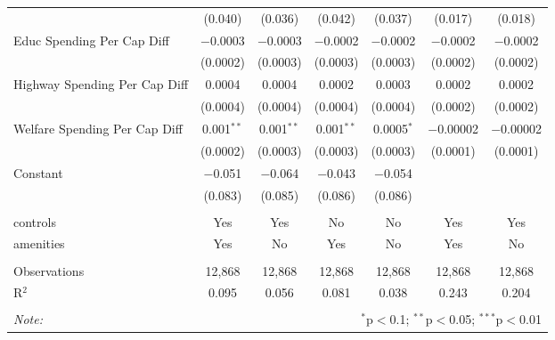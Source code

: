 \begin{table}[!htbp]
\begin{tabular}{@{\extracolsep{5pt}}lcccccc}
  & (0.040) & (0.036) & (0.042) & (0.037) & (0.017) & (0.018) \\ 
  Educ Spending Per Cap Diff & $-$0.0003 & $-$0.0003 & $-$0.0002 & $-$0.0002 & $-$0.0002 & $-$0.0002 \\ 
  & (0.0002) & (0.0003) & (0.0003) & (0.0003) & (0.0002) & (0.0002) \\ 
  Highway Spending Per Cap Diff & 0.0004 & 0.0004 & 0.0002 & 0.0003 & 0.0002 & 0.0002 \\ 
  & (0.0004) & (0.0004) & (0.0004) & (0.0004) & (0.0002) & (0.0002) \\ 
  Welfare Spending Per Cap Diff & 0.001$^{**}$ & 0.001$^{**}$ & 0.001$^{**}$ & 0.0005$^{*}$ & $-$0.00002 & $-$0.00002 \\ 
  & (0.0002) & (0.0003) & (0.0003) & (0.0003) & (0.0001) & (0.0001) \\ 
  Constant & $-$0.051 & $-$0.064 & $-$0.043 & $-$0.054 &  &  \\ 
  & (0.083) & (0.085) & (0.086) & (0.086) &  &  \\ 
 \hline \\[-1.8ex] 
controls & Yes & Yes & No & No & Yes & Yes \\ 
amenities & Yes & No & Yes & No & Yes & No \\ 
\hline \\[-1.8ex] 
Observations & 12,868 & 12,868 & 12,868 & 12,868 & 12,868 & 12,868 \\ 
R$^{2}$ & 0.095 & 0.056 & 0.081 & 0.038 & 0.243 & 0.204 \\ 
\hline 
\hline \\[-1.8ex] 
\textit{Note:}  & \multicolumn{6}{r}{$^{*}$p$<$0.1; $^{**}$p$<$0.05; $^{***}$p$<$0.01} \\ 
\end{tabular} 
\end{table} 
